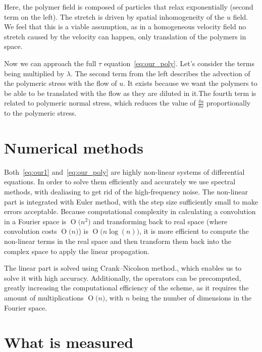 \documentclass[11pt,a4paper]{article}
\newcommand{\BigO}[1]{\ensuremath{\operatorname{O}\bigl(#1\bigr)}}
\begin{document}
Here, the polymer field is composed of particles that relax exponentially (second term on the left).
The stretch is driven by spatial inhomogeneity of the $u$ field.
We feel that this is a viable assumption, as in a homogeneous velocity field no stretch caused by the velocity can happen, only translation of the polymers in space.

Now we can approach the full $\tau$ equation~\eqref{eq:our_poly}.
Let's consider the terms being multiplied by $\lambda$.
The second term from the left describes the advection of the polymeric stress with the flow of $u$.
It exists because we want the polymers to be able to be translated with the flow as they are diluted in it.The fourth term is related to polymeric normal stress, which reduces the value of $\frac{\delta u}{\delta x}$ proportionally to the polymeric stress.

\section{Numerical methods}
Both~\eqref{eq:our1} and~\eqref{eq:our_poly} are highly non-linear systems of differential equations.
In order to solve them efficiently and accurately we use spectral methods\cite{Orszag80}, with dealiasing to get rid of the high-frequency noise.
The non-linear part is integrated with Euler method, with the step size sufficiently small to make errors acceptable.
Because computational complexity in calculating a convolution in a Fourier space is \BigO{n^2} and transforming back to real space (where convolution costs \BigO{n}) is \BigO{n\log(n)}, it is more efficient to compute the non-linear terms in the real space and then transform them back into the complex space to apply the linear propagation.

The linear part is solved using Crank--Nicolson method., which enables us to solve it with high accuracy.
Additionally, the operators can be precomputed, greatly increasing the computational efficiency of the scheme, as it requires the amount of multiplications \BigO{n}, with $n$ being the number of dimensions in the Fourier space.


\section{What is measured}
\end{document}
